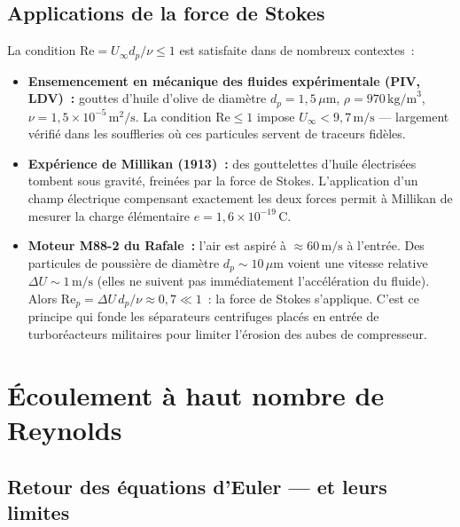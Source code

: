 \documentclass[11pt,a4paper]{report}
\begin{document}
\subsection{Applications de la force de Stokes}

La condition $\mathrm{Re} = U_\infty d_p/\nu \leq 1$ est satisfaite dans de nombreux
contextes~:

\begin{itemize}
  \item \textbf{Ensemencement en m\'ecanique des fluides exp\'erimentale (PIV, LDV)~:}
    gouttes d'huile d'olive de diam\`etre $d_p = 1{,}5\,\mu$m, $\rho = 970\,\text{kg/m}^3$,
    $\nu = 1{,}5\times10^{-5}\,\text{m}^2/\text{s}$. La condition $\mathrm{Re} \leq 1$
    impose $U_\infty < 9{,}7\,\text{m/s}$ --- largement v\'erifi\'e dans les souffleries
    o\`u ces particules servent de traceurs fid\`eles.

  \item \textbf{Exp\'erience de Millikan (1913)~:} des gouttelettes d'huile \'electris\'ees
    tombent sous gravit\'e, frein\'ees par la force de Stokes. L'application d'un champ
    \'electrique compensant exactement les deux forces permit \`a Millikan de mesurer la
    charge \'el\'ementaire $e = 1{,}6\times10^{-19}\,\text{C}$.

  \item \textbf{Moteur M88-2 du Rafale~:} l'air est aspir\'e \`a ${\approx}60\,\text{m/s}$
    \`a l'entr\'ee. Des particules de poussi\`ere de diam\`etre $d_p\sim 10\,\mu$m voient
    une vitesse relative $\Delta U\sim 1\,\text{m/s}$ (elles ne suivent pas imm\'ediatement
    l'acc\'el\'eration du fluide). Alors $\mathrm{Re}_p = \Delta U\,d_p/\nu \approx 0{,}7
    \ll 1$~: la force de Stokes s'applique. C'est ce principe qui fonde les s\'eparateurs
    centrifuges plac\'es en entr\'ee de turbor\'eacteurs militaires pour limiter
    l'\'erosion des aubes de compresseur.
\end{itemize}

\section{\'Ecoulement \`a haut nombre de Reynolds}

\subsection{Retour des \'equations d'Euler --- et leurs limites}
\end{document}
